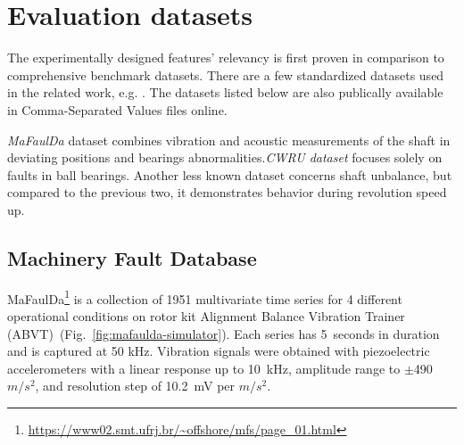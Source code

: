 \section{Evaluation datasets}
The experimentally designed features' relevancy is first proven in comparison to comprehensive benchmark datasets. There are a few standardized datasets used in the related work, e.g. \cite{ribeiro_rotating_2017}. The datasets listed below are also publically available in Comma-Separated Values files online.

\emph{MaFaulDa} dataset combines vibration and acoustic measurements of the shaft in deviating positions and bearings abnormalities.\emph{CWRU dataset} focuses solely on faults in ball bearings. Another less known dataset concerns shaft unbalance, but compared to the previous two, it demonstrates behavior during revolution speed up.  

\subsection{Machinery Fault Database}
MaFaulDa\footnote{\url{https://www02.smt.ufrj.br/~offshore/mfs/page_01.html}} is a collection of 1951 multivariate time series for 4 different operational conditions on rotor kit Alignment Balance Vibration Trainer (ABVT)~(Fig.~\ref{fig:mafaulda-simulator}). Each series has 5~seconds in duration and is captured at 50 kHz. Vibration signals were obtained with piezoelectric accelerometers with a linear response up to 10~kHz, amplitude range to $\pm$490 $m/s^2$, and resolution step of 10.2~mV per $m/s^2$. 

